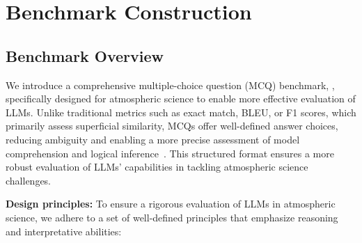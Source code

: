 \section{Benchmark Construction}

\subsection{Benchmark Overview}


We introduce a comprehensive multiple-choice question (MCQ) benchmark, \name, specifically designed for atmospheric science to enable more effective evaluation of LLMs. Unlike traditional metrics such as exact match, BLEU, or F1 scores, which primarily assess superficial similarity, %
MCQs offer well-defined answer choices, reducing ambiguity and enabling a more precise assessment of model comprehension and logical inference~\cite{balepur2024your}. This structured format ensures a more robust evaluation of LLMs' capabilities in tackling atmospheric science challenges.




\textbf{Design principles:}
To ensure a rigorous evaluation of LLMs in atmospheric science, we adhere to a set of well-defined principles that emphasize reasoning and interpretative abilities: 


